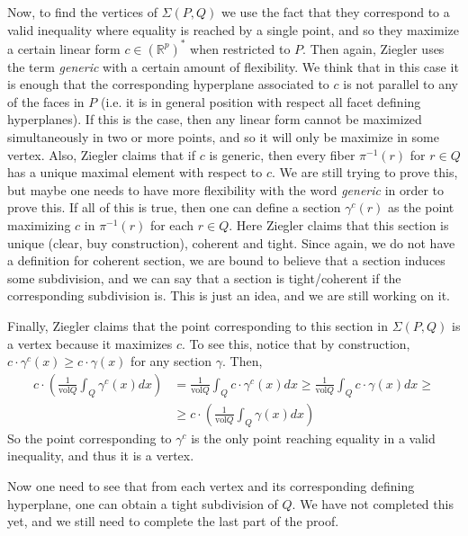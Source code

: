 \documentclass[12pt,a4paper]{article}
\newcommand{\RR}{\mathbb{R}}
\newcommand{\vol}{\text{vol}}
\begin{document}
\begin{comment}
	Following the idea that a subdivision is tight if $\dim F = \dim \pi(F)$ for all $F \in \mathcal{F}(P)$, we define a linear section $\gamma$ to be tight if $\dim F = \dim \gamma(F)$ for all $F\in \mathcal{F}(Q)$, and so a piecewise linear section will be tight if it is in each piece. 
	Another option, using the measure theoretic definition of tightness, would be to say that a section $\gamma$ is tight if for any $\epsilon >0$ there exists a compact subset $K_\epsilon\subset Q$ such that the Lebesgue measure $\mu(\gamma(Q\setminus K_\epsilon))<\epsilon$. In any case, we are still working on understanding what these definitions actually mean and how any of them would correspond to both of Ziegler's claims.
\end{comment}

Now, to find the vertices of $\Sigma(P,Q)$ we use the fact that they correspond to a valid inequality where equality is reached by a single point, and so they maximize a certain linear form $c\in (\RR^p)^*$ when restricted to $P$. 
Then again, Ziegler uses the term \textit{generic} with a certain amount of flexibility. We think that in this case it is enough that the corresponding hyperplane associated to $c$ is not parallel to any of the faces in $P$ (i.e. it is in general position with respect all facet defining hyperplanes). 
If this is the case, then any linear form cannot be maximized simultaneously in two or more points, and so it will only be maximize in some vertex. 
Also, Ziegler claims that if $c$ is generic, then every fiber $\pi^{-1}(r)$ for $r \in Q$ has a unique maximal element with respect to $c$. 
We are still trying to prove this, but maybe one needs to have more flexibility with the word \textit{generic} in order to prove this.
If all of this is true, then one can define a section $\gamma^c(r)$ as the point maximizing $c$ in $\pi^{-1}(r)$ for each $r\in Q$. 
Here Ziegler claims that this section is unique (clear, buy construction), coherent and tight. 
Since again, we do not have a definition for coherent section, we are bound to believe that a section induces some subdivision, and we can say that a section is tight/coherent if the corresponding subdivision is. 
This is just an idea, and we are still working on it.

Finally, Ziegler claims that the point corresponding to this section in $\Sigma(P,Q)$ is a vertex because it maximizes $c$. To see this, notice that by construction, $c\cdot \gamma^c(x)\geq c \cdot \gamma(x)$ for any section $\gamma$. Then, 
\begin{displaymath}
\begin{split}
c\cdot \left( \frac{1}{\vol Q} \int_Q \gamma^c(x)dx\right) & =  \frac{1}{\vol Q} \int_Q c\cdot \gamma^c(x)dx \geq \frac{1}{\vol Q} \int_Q c\cdot \gamma(x)dx \geq  \\
& \geq c\cdot \left( \frac{1}{\vol Q} \int_Q \gamma(x)dx\right)
\end{split}
\end{displaymath}
So the point corresponding to $\gamma^c$ is the only point reaching equality in a valid inequality, and thus it is a vertex.

Now one need to see that from each vertex and its corresponding defining hyperplane, one can obtain a tight subdivision of $Q$. 
We have not completed this yet, and we still need to complete the last part of the proof. 
\end{document}
